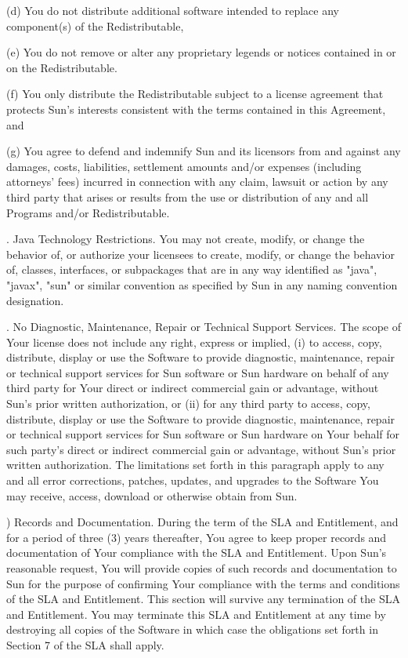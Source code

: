 \bigskip 
\par \noindent (d) You do not distribute additional software intended to replace any component(s) of the Redistributable,
\bigskip 
\par \noindent (e) You do not remove or alter any proprietary legends or notices contained in or on the Redistributable.
 \bigskip 
\par \noindent (f) You only distribute the Redistributable subject to a license agreement that protects Sun's interests consistent with the terms contained in this Agreement, and
\bigskip 
\par \noindent (g) You agree to defend and indemnify Sun and its licensors from and against any damages, costs, liabilities, settlement amounts and/or expenses  (including attorneys' fees) incurred in connection with any claim, lawsuit or action by any third party that arises or results from the use or distribution of any and all Programs and/or Redistributable.
\bigskip 
\par {}. Java Technology Restrictions.  You may not create, modify, or change the behavior of, or authorize your licensees to create, modify, or change the behavior of, classes, interfaces, or subpackages that are in any way identified as "java", "javax", "sun" or similar convention as specified by Sun in any naming convention designation.
\bigskip 
\par {}. No Diagnostic, Maintenance, Repair or Technical Support Services.  The scope of Your license does not include any right, express or implied, (i) to access, copy, distribute, display or use the Software to provide diagnostic, maintenance, repair or technical support services for Sun software or Sun hardware on behalf of any third party for Your direct or indirect commercial gain or advantage, without Sun's prior written authorization, or (ii) for any third party to access, copy, distribute, display or use the Software to provide diagnostic, maintenance, repair or technical support services for Sun software or Sun hardware on Your behalf for such party's direct or indirect commercial gain or advantage, without Sun's prior written authorization. The limitations set forth in this paragraph apply to any and all error corrections, patches, updates, and upgrades to the Software You may receive, access, download or otherwise obtain from Sun.
\bigskip 
\par {}) Records and Documentation.  During the term of the SLA and Entitlement, and for a period of three (3) years thereafter, You agree to keep proper records and documentation of Your compliance with the SLA and Entitlement. Upon Sun's reasonable request, You will provide copies of such records and documentation to Sun for the purpose of confirming Your compliance with the terms and conditions of the SLA and Entitlement. This section will survive any termination of the SLA and Entitlement. You may terminate this SLA and Entitlement at any time by destroying all copies of the Software in which case the obligations set forth in Section 7 of the SLA shall apply.
